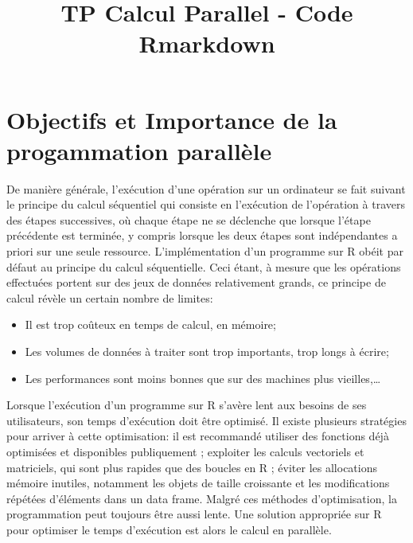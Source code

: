 \documentclass[
]{article}
\title{TP Calcul Parallel - Code Rmarkdown}
\author{}
\date{\vspace{-2.5em}}
\begin{document}
\maketitle
\hrulefill
{
\setcounter{tocdepth}{2}
\tableofcontents
}
\hrulefill

\newpage

\hypertarget{objectifs-et-importance-de-la-progammation-paralluxe8le}{%
\section{Objectifs et Importance de la progammation
parallèle}\label{objectifs-et-importance-de-la-progammation-paralluxe8le}}

De manière générale, l'exécution d'une opération sur un ordinateur se
fait suivant le principe du calcul séquentiel qui consiste en
l'exécution de l'opération à travers des étapes successives, où chaque
étape ne se déclenche que lorsque l'étape précédente est terminée, y
compris lorsque les deux étapes sont indépendantes a priori sur une
seule ressource. L'implémentation d'un programme sur R obéit par défaut
au principe du calcul séquentielle. Ceci étant, à mesure que les
opérations effectuées portent sur des jeux de données relativement
grands, ce principe de calcul révèle un certain nombre de limites:

\begin{itemize}
\item
  Il est trop coûteux en temps de calcul, en mémoire;
\item
  Les volumes de données à traiter sont trop importants, trop longs à
  écrire;
\item
  Les performances sont moins bonnes que sur des machines plus
  vieilles,\ldots{}
\end{itemize}

Lorsque l'exécution d'un programme sur R s'avère lent aux besoins de ses
utilisateurs, son temps d'exécution doit être optimisé. Il existe
plusieurs stratégies pour arriver à cette optimisation: il est
recommandé utiliser des fonctions déjà optimisées et disponibles
publiquement ; exploiter les calculs vectoriels et matriciels, qui sont
plus rapides que des boucles en R ; éviter les allocations mémoire
inutiles, notamment les objets de taille croissante et les modifications
répétées d'éléments dans un data frame. Malgré ces méthodes
d'optimisation, la programmation peut toujours être aussi lente. Une
solution appropriée sur R pour optimiser le temps d'exécution est alors
le calcul en parallèle.
\end{document}
